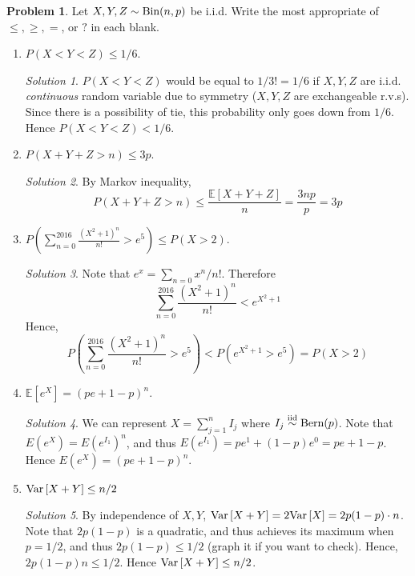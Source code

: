 \documentclass[11pt]{article}
\theoremstyle{definition}
\newtheorem{prob}[theo]{\color{Maroon} Problem}
\theoremstyle{remark}
\newtheorem*{soln}{\color{Maroon} Solution}
\newcommand{\E}[1]{\mathbb{E}\left[ #1 \right]}
\renewcommand{\var}[1]{\textnormal{Var}\left[ #1 \right]}
\newcommand{\Bin}{\textnormal{Bin}}
\newcommand{\Bern}{\textnormal{Bern}}
\newcommand{\iidsim}{\overset{\text{iid}}{\sim}}
\begin{document}
\pagebreak

\begin{prob} Let $X,Y,Z \sim \Bin(n,p)$ be i.i.d. Write the most appropriate of $\leq, \geq, = $, or $?$ in each blank.

\begin{enumerate}[label = (\alph*)]
    \item $P(X<Y<Z) \leq 1/6$. 
    
    \begin{soln} $P(X<Y<Z)$ would be equal to $1/3!=1/6$ if $X,Y,Z$ are i.i.d. \textit{continuous} random variable due to symmetry ($X,Y,Z$ are exchangeable r.v.s). Since there is a possibility of tie, this probability only goes down from $1/6$. Hence $P(X<Y<Z) < 1/6$.
    \end{soln}
    
    \dotfill
    
    \item $P(X+Y+Z > n) \leq 3p$. 
    
    \begin{soln} By Markov inequality, $$P(X+Y+Z > n) \leq \frac{\E{X+Y+Z}}{n} = \frac{3np}{p} = 3p$$ 
    \end{soln}
    
    \dotfill
    
    \item $P \left( \sum_{n=0}^{2016} \frac{(X^2+1)^n}{n!} > e^5 \right) \leq P( X > 2 )$.
    
    \begin{soln}
    Note that $e^x = \sum_{n=0} x^n/n!$. Therefore $$ \sum_{n=0}^{2016} \frac{(X^2+1)^n}{n!} < e^{X^2+1} $$ Hence, $$ P \left( \sum_{n=0}^{2016} \frac{(X^2+1)^n}{n!} > e^5 \right) < P ( e^{X^2+1} > e^5 ) = P( X > 2 ) $$ 
    \end{soln}
    
    \dotfill
    
    \item $\E{e^X} = (pe+1-p)^n$. 
    
    \begin{soln} We can represent $X = \sum_{j=1}^n I_j$ where $I_j \iidsim \Bern(p)$. Note that $E(e^X) = E(e^{I_1})^n$, and thus $E(e^{I_1}) = pe^1 + (1-p)e^0 = pe+1-p$. Hence $E(e^X) = (pe+1-p)^n$. 
    \end{soln}
    
    \dotfill
    
    \item $\var{X+Y} \leq n/2$
    
    \begin{soln}
    By independence of $X,Y$, $\var{X+Y} = 2\var{X} = 2p(1-p) \cdot n$. Note that $2p(1-p)$ is a quadratic, and thus achieves its maximum when $p=1/2$, and thus $2p(1-p) \leq 1/2$ (graph it if you want to check). Hence, $2p(1-p)n \leq 1/2$. Hence $\var{X+Y} \leq n/2$.
    \end{soln}
    

\end{enumerate}
\end{prob}
\end{document}
